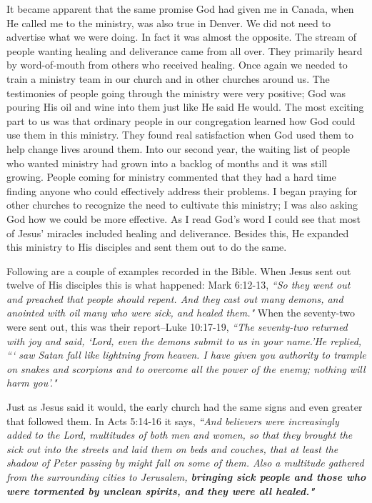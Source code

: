 \documentclass[oneside]{book}
\begin{document}
It became apparent that the same promise God had given me in Canada, when He called me to the ministry, was also true in Denver. We did not need to advertise what we were doing. In fact it was almost the opposite. The stream of people wanting healing and deliverance came from all over. They primarily heard by word-of-mouth from others who received healing. Once again we needed to train a ministry team in our church and in other churches around us. The testimonies of people going through the ministry were very positive; God was pouring His oil and wine into them just like He said He would. The most exciting part to us was that ordinary people in our congregation learned how God could use them in this ministry. They found real satisfaction when God used them to help change lives around them. Into our second year, the waiting list of people who wanted ministry had grown into a backlog of months and it was still growing. People coming for ministry commented that they had a hard time finding anyone who could effectively address their problems. I began praying for other churches to recognize the need to cultivate this ministry; I was also asking God how we could be more effective. As I read God's word I could see that most of Jesus' miracles included healing and deliverance. Besides this, He expanded this ministry to His disciples and sent them out to do the same.

Following are a couple of examples recorded in the Bible. When Jesus sent out twelve of His disciples this is what happened: Mark 6:12-13, \textit{``So they went out and preached that people should repent. And they cast out many demons, and anointed with oil many who were sick, and healed them."} When the seventy-two were sent out, this was their report--Luke 10:17-19, \textit{``The seventy-two returned with joy and said, `Lord, even the demons submit to us in your name.'He replied, ``` saw Satan fall like lightning from heaven. I have given you authority to trample on snakes and scorpions and to overcome all the power of the enemy; nothing will harm you'."}

Just as Jesus said it would, the early church had the same signs and even greater that followed them. In Acts 5:14-16 it says, \textit{``And believers were increasingly added to the Lord, multitudes of both men and women, so that they brought the sick out into the streets and laid them on beds and couches, that at least the shadow of Peter passing by might fall on some of them. Also a multitude gathered from the surrounding cities to Jerusalem, \textbf{bringing sick people and those who were tormented by unclean spirits, and they were all healed."}}
\end{document}
